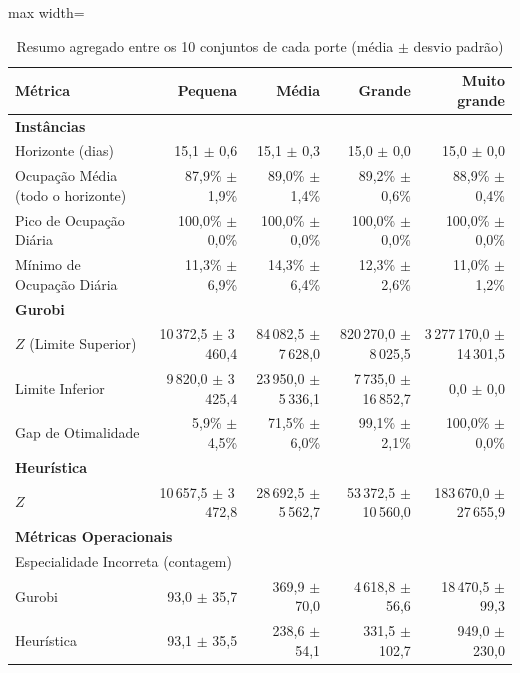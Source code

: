 \begin{table}[htbp]
    \caption{Resumo agregado entre os 10 conjuntos de cada porte (média $\pm$ desvio padrão)}
    \label{tab:agregado}
    \centering
    \begin{adjustbox}{max width=\textwidth}
    \begin{tabular}{lrrrr}
        \hline
        \textbf{Métrica} & \textbf{Pequena} & \textbf{Média} & \textbf{Grande} & \textbf{Muito grande} \\
        \hline
        \multicolumn{5}{l}{\textbf{Instâncias}} \\
        Horizonte (dias) & 15,1 $\pm$ 0,6 & 15,1 $\pm$ 0,3 & 15,0 $\pm$ 0,0 & 15,0 $\pm$ 0,0 \\
        Ocupação Média (todo o horizonte) & 87,9\% $\pm$ 1,9\% & 89,0\% $\pm$ 1,4\% & 89,2\% $\pm$ 0,6\% & 88,9\% $\pm$ 0,4\% \\
        Pico de Ocupação Diária & 100,0\% $\pm$ 0,0\% & 100,0\% $\pm$ 0,0\% & 100,0\% $\pm$ 0,0\% & 100,0\% $\pm$ 0,0\% \\
        Mínimo de Ocupação Diária & 11,3\% $\pm$ 6,9\% & 14,3\% $\pm$ 6,4\% & 12,3\% $\pm$ 2,6\% & 11,0\% $\pm$ 1,2\% \\
        \hline
        \multicolumn{5}{l}{\textbf{Gurobi}} \\
        $Z$ (Limite Superior) & 10\,372,5 $\pm$ 3\,460,4 & 84\,082,5 $\pm$ 7\,628,0 & 820\,270,0 $\pm$ 8\,025,5 & 3\,277\,170,0 $\pm$ 14\,301,5 \\
        Limite Inferior & 9\,820,0 $\pm$ 3\,425,4 & 23\,950,0 $\pm$ 5\,336,1 & 7\,735,0 $\pm$ 16\,852,7 & 0,0 $\pm$ 0,0 \\
        Gap de Otimalidade & 5,9\% $\pm$ 4,5\% & 71,5\% $\pm$ 6,0\% & 99,1\% $\pm$ 2,1\% & 100,0\% $\pm$ 0,0\% \\
        \hline
        \multicolumn{5}{l}{\textbf{Heurística}} \\
        $Z$ & 10\,657,5 $\pm$ 3\,472,8 & 28\,692,5 $\pm$ 5\,562,7 & 53\,372,5 $\pm$ 10\,560,0 & 183\,670,0 $\pm$ 27\,655,9 \\
        \hline
        \multicolumn{5}{l}{\textbf{Métricas Operacionais}} \\
        \multicolumn{5}{l}{Especialidade Incorreta (contagem)} \\
        \quad Gurobi & 93,0 $\pm$ 35,7 & 369,9 $\pm$ 70,0 & 4\,618,8 $\pm$ 56,6 & 18\,470,5 $\pm$ 99,3 \\
        \quad Heurística & 93,1 $\pm$ 35,5 & 238,6 $\pm$ 54,1 & 331,5 $\pm$ 102,7 & 949,0 $\pm$ 230,0 \\

\end{tabular}
\end{adjustbox}
\end{table}
